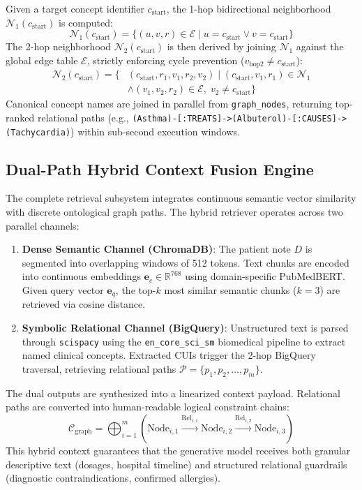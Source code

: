 \documentclass[11pt, a4paper]{article}
\begin{document}
Given a target concept identifier $c_{\text{start}}$, the 1-hop bidirectional neighborhood $\mathcal{N}_1(c_{\text{start}})$ is computed:
\begin{equation}
  \mathcal{N}_1(c_{\text{start}}) = \{ (u, v, r) \in \mathcal{E} \mid u = c_{\text{start}} \lor v = c_{\text{start}} \}
\end{equation}
The 2-hop neighborhood $\mathcal{N}_2(c_{\text{start}})$ is then derived by joining $\mathcal{N}_1$ against the global edge table $\mathcal{E}$, strictly enforcing cycle prevention ($v_{\text{hop2}} \neq c_{\text{start}}$):
\begin{equation}
  \begin{aligned}
    \mathcal{N}_2(c_{\text{start}}) = \{ & (c_{\text{start}}, r_1, v_1, r_2, v_2) \mid (c_{\text{start}}, v_1, r_1) \in \mathcal{N}_1 \\
    & \land (v_1, v_2, r_2) \in \mathcal{E}, \; v_2 \neq c_{\text{start}} \}
  \end{aligned}
\end{equation}
Canonical concept names are joined in parallel from \texttt{graph\_nodes}, returning top-ranked relational paths (e.g., \texttt{(Asthma)-[:TREATS]->(Albuterol)-[:CAUSES]->(Tachycardia)}) within sub-second execution windows.

\subsection{Dual-Path Hybrid Context Fusion Engine}
The complete retrieval subsystem integrates continuous semantic vector similarity with discrete ontological graph paths. The hybrid retriever operates across two parallel channels:
\begin{enumerate}
  \item \textbf{Dense Semantic Channel (ChromaDB)}: The patient note $D$ is segmented into overlapping windows of 512 tokens. Text chunks are encoded into continuous embeddings $\mathbf{e}_c \in \mathbb{R}^{768}$ using domain-specific PubMedBERT. Given query vector $\mathbf{e}_q$, the top-$k$ most similar semantic chunks ($k = 3$) are retrieved via cosine distance.
  \item \textbf{Symbolic Relational Channel (BigQuery)}: Unstructured text is parsed through \texttt{scispacy} using the \texttt{en\_core\_sci\_sm} biomedical pipeline to extract named clinical concepts. Extracted CUIs trigger the 2-hop BigQuery traversal, retrieving relational paths $\mathcal{P} = \{p_1, p_2, \dots, p_m\}$.
\end{enumerate}
The dual outputs are synthesized into a linearized context payload. Relational paths are converted into human-readable logical constraint chains:
\begin{equation}
  \mathcal{C}_{\text{graph}} = \bigoplus_{i=1}^m \left( \text{Node}_{i,1} \xrightarrow{\text{Rel}_{i,1}} \text{Node}_{i,2} \xrightarrow{\text{Rel}_{i,2}} \text{Node}_{i,3} \right)
\end{equation}
This hybrid context guarantees that the generative model receives both granular descriptive text (dosages, hospital timeline) and structured relational guardrails (diagnostic contraindications, confirmed allergies).
\end{document}
